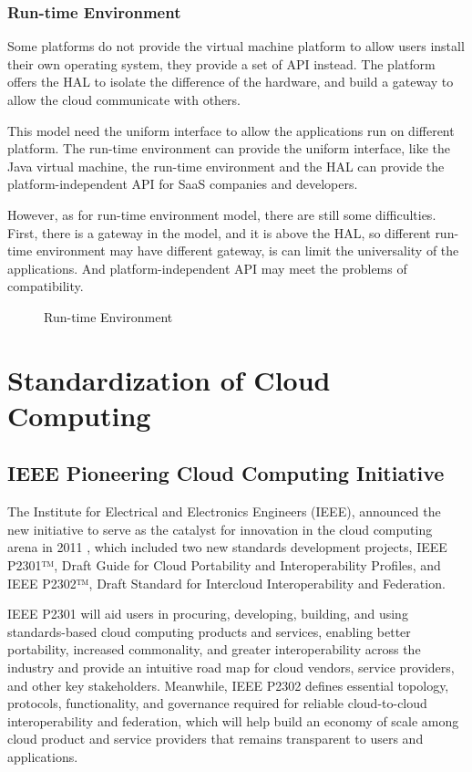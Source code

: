 \documentclass[conference]{IEEEtran}
\begin{document}
\subsubsection{Run-time Environment}
Some platforms do not provide the virtual machine platform to allow users install their own operating system, they provide a set of API instead. The platform offers the HAL to isolate the difference of the hardware, and build a gateway to allow the cloud communicate with others.

This model need the uniform interface to allow the applications run on different platform. The run-time environment can provide the uniform interface, like the Java virtual machine, the run-time environment and the HAL can provide the platform-independent API for SaaS companies and developers.

However, as for run-time environment model, there are still some difficulties. First, there is a gateway in the model, and it is above the HAL, so different run-time environment may have different gateway, is can limit the universality of the applications. And platform-independent API may meet the problems of compatibility.

\begin{figure}[h]
\centering
{}
\caption{Run-time Environment}
\label{fig_05}
\end{figure}


\section{Standardization of Cloud Computing}
\subsection{IEEE Pioneering Cloud Computing Initiative}
The Institute for Electrical and Electronics Engineers (IEEE), announced the new initiative to serve as the catalyst for innovation in the cloud computing arena in 2011\cite{IEEE} , which included two new standards development projects, IEEE P2301™, Draft Guide for Cloud Portability and Interoperability Profiles, and IEEE P2302™, Draft Standard for Intercloud Interoperability and Federation.

IEEE P2301 will aid users in procuring, developing, building, and using standards-based cloud computing products and services, enabling better portability, increased commonality, and greater interoperability across the industry and provide an intuitive road map for cloud vendors, service providers, and other key stakeholders. Meanwhile, IEEE P2302 defines essential topology, protocols, functionality, and governance required for reliable cloud-to-cloud interoperability and federation, which will help build an economy of scale among cloud product and service providers that remains transparent to users and applications.\cite{IEEE} \cite{P2302}
\end{document}
